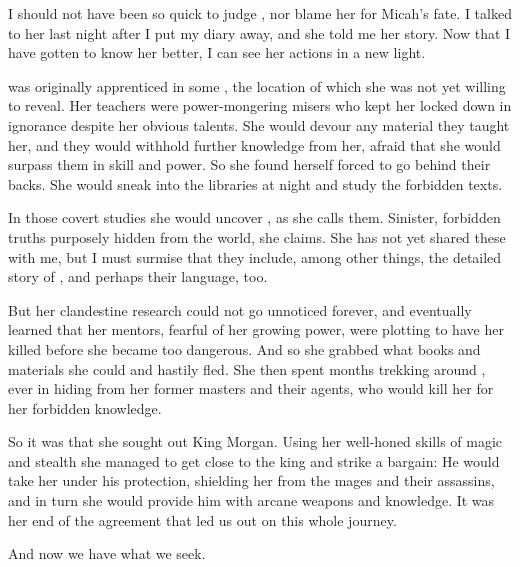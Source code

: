 \begin{diary}%
\diarystamp{\dateEreshKalLeftBehindDayOne}

\new
I should not have been so quick to judge \Miss \Takestsha, nor blame her for Micah's fate. 
I talked to her last night after I put my diary away, and she told me her story. 
Now that I have gotten to know her better, I can see her actions in a new light. 
% 
% 

\Miss \Takestsha{} was originally apprenticed in some \ishrah{}, the location of which she was not yet willing to reveal. 
Her teachers were power-mongering misers who kept her locked down in ignorance despite her obvious talents. 
She would devour any material they taught her, and they would withhold further knowledge from her, afraid that she would surpass them in skill and power. 
So she found herself forced to go behind their backs. 
She would sneak into the libraries at night and study the forbidden texts. 

In those covert studies she would uncover , as she calls them. 
Sinister, forbidden truths purposely hidden from the world, she claims. 
She has not yet shared these  with me, but I must surmise that they include, among other things, the detailed story of \EreshKal, and perhaps their language, too. 

But her clandestine research could not go unnoticed forever, and eventually \Takestsha{} learned that her mentors, fearful of her growing power, were plotting to have her killed before she became too dangerous. 
And so she grabbed what books and materials she could and hastily fled. 
She then spent months trekking around \Velcad, ever in hiding from her former masters and their agents, who would kill her for her forbidden knowledge. 

So it was that she sought out King Morgan. 
Using her well-honed skills of magic and stealth she managed to get close to the king and strike a bargain: 
He would take her under his protection, shielding her from the mages and their assassins, and in turn she would provide him with arcane weapons and knowledge. 
It was her end of the agreement that led us out on this whole journey. 

And now we have what we seek. 










\end{diary}










